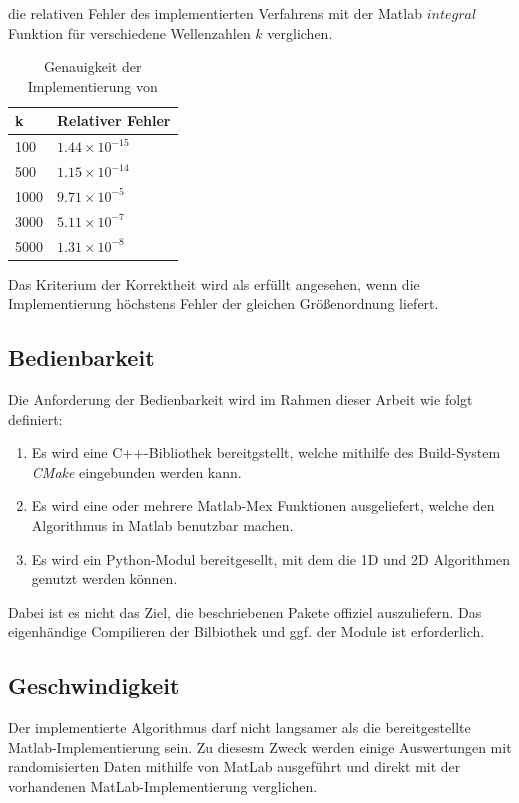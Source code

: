 die relativen Fehler des implementierten Verfahrens mit der Matlab $integral$ Funktion für verschiedene Wellenzahlen $k$ verglichen.
\begin{table}[ht]
    \centering
    \begin{tabular}{|l|l|}
    \hline
    k & Relativer Fehler \\ 
    \hline \hline
    100  & $1.44 × 10^{-15}$ \\
    500  &  $1.15 × 10^{-14}$ \\
    1000 &  $9.71 × 10^{-5}$ \\
    3000 &  $5.11 × 10^{-7}$ \\
    5000 & $1.31 × 10^{-8}$ \\  \hline
    \end{tabular}    
    \caption{Genauigkeit der Implementierung von \cite*[]{gasperini:hal-03209144}}
\end{table} 
Das Kriterium der Korrektheit wird als erfüllt angesehen, wenn die Implementierung höchstens Fehler der gleichen Größenordnung liefert.


\subsection{Bedienbarkeit}

Die Anforderung der Bedienbarkeit wird im Rahmen dieser Arbeit wie folgt definiert:

\begin{enumerate}
    \item Es wird eine C++-Bibliothek bereitgstellt, welche mithilfe des Build-System \textit{CMake} eingebunden werden kann. 
    \item Es wird eine oder mehrere Matlab-Mex Funktionen ausgeliefert, welche den Algorithmus in Matlab benutzbar machen. 
    \item Es wird ein Python-Modul bereitgesellt, mit dem die 1D und 2D Algorithmen genutzt werden können.
\end{enumerate}

Dabei ist es nicht das Ziel, die beschriebenen Pakete offiziel auszuliefern. Das eigenhändige Compilieren der Bilbiothek und ggf. der Module ist erforderlich.

\subsection{Geschwindigkeit}\label{Performance}


Der implementierte Algorithmus darf nicht langsamer als die bereitgestellte Matlab-Implementierung sein.
Zu diesesm Zweck werden einige Auswertungen mit randomisierten Daten mithilfe von MatLab ausgeführt und direkt mit der vorhandenen MatLab-Implementierung verglichen.



